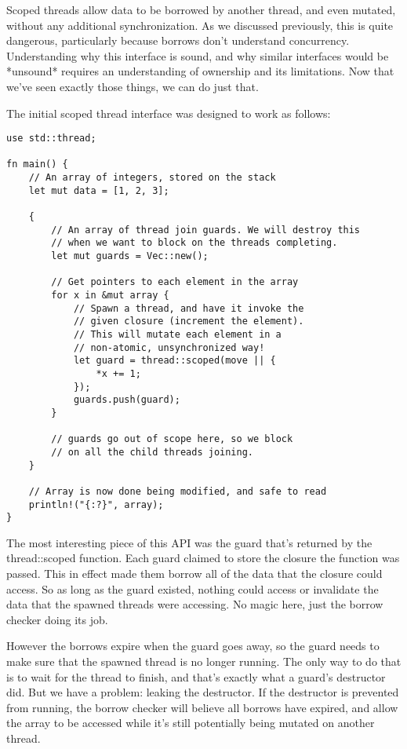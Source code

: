 Scoped threads allow data to be borrowed by another thread, and even mutated,
without any additional synchronization. As we discussed previously, this is quite
dangerous, particularly because borrows don't understand concurrency. Understanding
why this interface is sound, and why similar interfaces would be *unsound* requires
an understanding of ownership and its limitations. Now that we've seen exactly those
things, we can do just that.

The initial scoped thread interface was designed to work as follows:

\begin{verbatim}
use std::thread;

fn main() {
    // An array of integers, stored on the stack
    let mut data = [1, 2, 3];

    {
        // An array of thread join guards. We will destroy this
        // when we want to block on the threads completing.
        let mut guards = Vec::new();

        // Get pointers to each element in the array
        for x in &mut array {
            // Spawn a thread, and have it invoke the
            // given closure (increment the element).
            // This will mutate each element in a
            // non-atomic, unsynchronized way!
            let guard = thread::scoped(move || {
                *x += 1;
            });
            guards.push(guard);
        }

        // guards go out of scope here, so we block
        // on all the child threads joining.
    }

    // Array is now done being modified, and safe to read
    println!("{:?}", array);
}
\end{verbatim}

The most interesting piece of this API was the guard that's returned
by the thread::scoped function. Each guard claimed to store the closure the
function was passed. This in effect made them borrow all of the
data that the closure could access. So as long as the guard existed, nothing
could access or invalidate the data that the spawned threads were accessing. No magic
here, just the borrow checker doing its job.

However the borrows expire when the guard goes away, so the guard needs to
make sure that the spawned thread is no longer running. The only way to do
that is to wait for the thread to finish, and that's exactly what a guard's
destructor did. But we have a problem: leaking the destructor. If the destructor
is prevented from running, the borrow checker will believe all borrows have
expired, and allow the array to be accessed while it's still potentially
being mutated on another thread.

